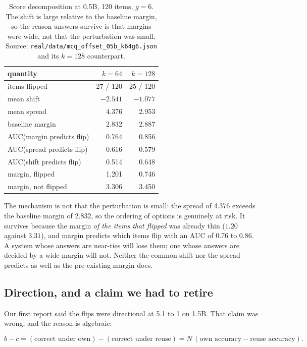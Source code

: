 \documentclass[10pt]{article}
\begin{document}
\begin{table}[h]
\centering
\caption{Score decomposition at 0.5B, 120 items, $g{=}6$. The shift is
large relative to the baseline margin, so the reason answers survive is
that margins were wide, not that the perturbation was small. Source:
\texttt{real/data/mcq\_offset\_05b\_k64g6.json} and its $k{=}128$ counterpart.}
\label{tab:offset}
\begin{tabular}{lrr}
\toprule
quantity & $k{=}64$ & $k{=}128$ \\
\midrule
items flipped & 27 / 120 & 25 / 120 \\
mean shift & $-2.541$ & $-1.077$ \\
mean spread & 4.376 & 2.953 \\
baseline margin & 2.832 & 2.887 \\
AUC(margin predicts flip) & 0.764 & 0.856 \\
AUC(spread predicts flip) & 0.616 & 0.579 \\
AUC(shift predicts flip) & 0.514 & 0.648 \\
margin, flipped & 1.201 & 0.746 \\
margin, not flipped & 3.306 & 3.450 \\
\bottomrule
\end{tabular}
\end{table}

The mechanism is not that the perturbation is small: the spread of 4.376 exceeds
the baseline margin of 2.832, so the ordering of options is genuinely at
risk. It survives because the margin \emph{of the items that flipped} was
already thin ($1.20$ against $3.31$), and margin predicts which items flip
with an AUC of 0.76 to 0.86. A system whose answers are near-ties will lose
them; one whose answers are decided by a wide margin will not. Neither the
common shift nor the spread predicts as well as the pre-existing margin does.

\subsection{Direction, and a claim we had to retire}

Our first report said the flips were directional at 5.1 to 1 on 1.5B. That
claim was wrong, and the reason is algebraic:

\begin{equation}
b - c = (\text{correct under own}) - (\text{correct under reuse})
      = N\,(\text{own accuracy} - \text{reuse accuracy}).
\end{equation}
\end{document}
